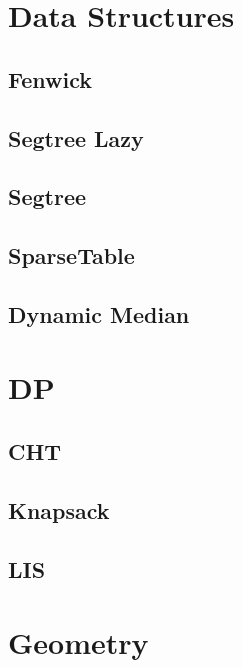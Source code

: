 \section{Data Structures}
\subsection{Fenwick}
\raggedbottom
\hrulefill
\subsection{Segtree Lazy}
\raggedbottom
\hrulefill
\subsection{Segtree}
\raggedbottom
\hrulefill
\subsection{SparseTable}
\raggedbottom
\hrulefill
\subsection{Dynamic Median}
\raggedbottom
\hrulefill

\section{DP}
\subsection{CHT}
\raggedbottom
\hrulefill
\subsection{Knapsack}
\raggedbottom
\hrulefill
\subsection{LIS}
\raggedbottom
\hrulefill

\section{Geometry}
